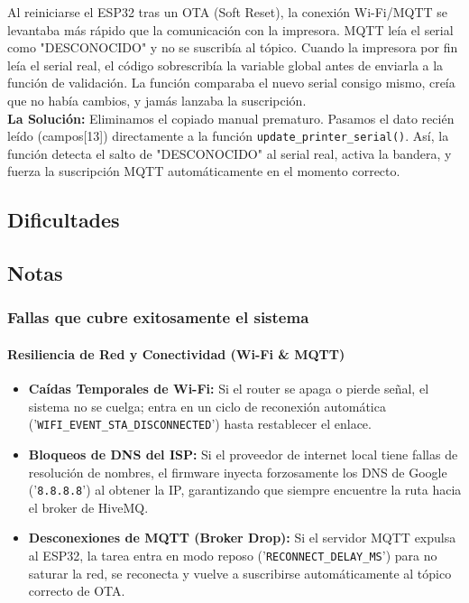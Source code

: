 \documentclass[12pt, a4paper]{article}
\begin{document}
    Al reiniciarse el ESP32 tras un OTA (Soft Reset), la conexión Wi-Fi/MQTT se levantaba más rápido que la comunicación con la impresora. MQTT leía el serial como "DESCONOCIDO" y no se suscribía al tópico. Cuando la impresora por fin leía el serial real, el código sobrescribía la variable global antes de enviarla a la función de validación. La función comparaba el nuevo serial consigo mismo, creía que no había cambios, y jamás lanzaba la suscripción.\\

    \textbf{La Solución:} Eliminamos el copiado manual prematuro. Pasamos el dato recién leído (campos[13]) directamente a la función \texttt{update\_printer\_serial()}. Así, la función detecta el salto de "DESCONOCIDO" al serial real, activa la bandera, y fuerza la suscripción MQTT automáticamente en el momento correcto.

    \subsection*{Dificultades}

    \subsection*{Notas}

    {\color{red} \subsubsection*{Fallas que cubre exitosamente el sistema}}
    
    \paragraph{Resiliencia de Red y Conectividad (Wi-Fi & MQTT)}

    \begin{itemize}
        \item \textbf{Caídas Temporales de Wi-Fi:} Si el router se apaga o pierde señal, el sistema no se cuelga; entra en un ciclo de reconexión automática ('\texttt{WIFI\_EVENT\_STA\_DISCONNECTED}') hasta restablecer el enlace.
        \item \textbf{Bloqueos de DNS del ISP:} Si el proveedor de internet local tiene fallas de resolución de nombres, el firmware inyecta forzosamente los DNS de Google ('\texttt{8.8.8.8}') al obtener la IP, garantizando que siempre encuentre la ruta hacia el broker de HiveMQ.
        \item \textbf{Desconexiones de MQTT (Broker Drop):} Si el servidor MQTT expulsa al ESP32, la tarea entra en modo reposo ('\texttt{RECONNECT\_DELAY\_MS}') para no saturar la red, se reconecta y vuelve a suscribirse automáticamente al tópico correcto de OTA.
    \end{itemize}
\end{document}
